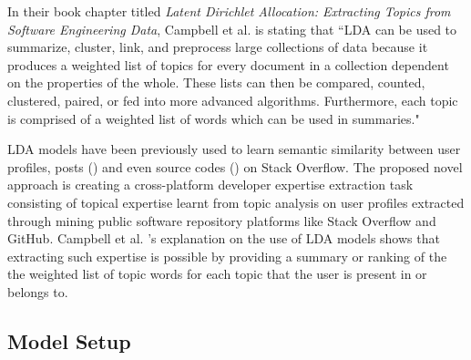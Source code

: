     In their book chapter titled \textit{Latent Dirichlet Allocation: Extracting Topics from Software Engineering Data}, Campbell et al. \cite{campbell2015latent} is stating that ``LDA can be used to summarize, cluster, link, and preprocess large collections of data because it produces a weighted list of topics for every document in a collection dependent on the properties of the whole. These lists can then be compared, counted, clustered, paired, or fed into more advanced algorithms. Furthermore, each topic is comprised of a weighted list of words which can be used in summaries."
    
    LDA models have been previously used to learn semantic similarity between user profiles, posts (\cite{tian2013predicting}) and even source codes (\cite{arwan2015source}) on Stack Overflow. The proposed novel approach is creating a cross-platform developer expertise extraction task consisting of topical expertise learnt from topic analysis on user profiles extracted through mining public software repository platforms like Stack Overflow and GitHub. Campbell et al. \cite{campbell2015latent}'s explanation on the use of LDA models shows that extracting such expertise is possible by providing a summary or ranking of the the weighted list of topic words for each topic that the user is present in or belongs to. 
        
    \subsection{Model Setup \label{activeUser_Def}}
    
